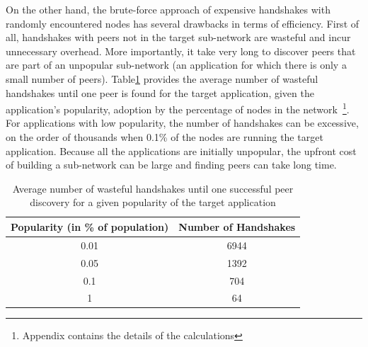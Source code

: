 On the other hand, the brute-force approach of expensive handshakes with randomly encountered nodes has several drawbacks in terms of efficiency. First of all, handshakes with peers not in the target sub-network are wasteful and incur unnecessary overhead. More importantly, it take very long to discover peers that are part of an unpopular sub-network (\ie an application for which there is only a small number of peers). Table\ref{tab:discv4Overhead} provides the average number of wasteful handshakes until one peer is found for the target application, given the application's popularity, \ie adoption by the percentage of nodes in the network~\footnote{Appendix contains the details of the calculations}. For applications with low popularity, the number of handshakes can be excessive, \ie on the order of thousands when 0.1\% of the nodes are running the target application. Because all the applications are initially unpopular, the upfront cost of building a sub-network can be large and finding peers can take long time.


\begin{table} [!hbt]
\caption{Average number of wasteful handshakes until one successful peer discovery for a given popularity of the target application}
\label{tab:discv4Overhead}
\renewcommand{\arraystretch}{1.5}
\renewcommand{\tabcolsep}{0.5em}
\centering
\scriptsize{
\begin{tabular} {c|c}
\textbf{Popularity (in \% of population)} & \textbf{Number of Handshakes} \\
\hline
0.01 & 6944 \\ 
\hline
0.05 & 1392 \\
\hline
0.1 & 704 \\
\hline
1 & 64 \\
\bottomrule
\end{tabular}
}
\vspace{-0.2in}
\end{table}


